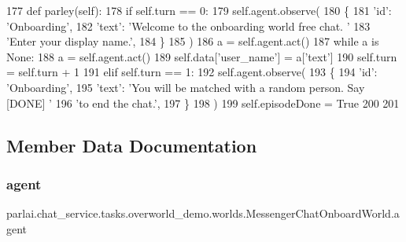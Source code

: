 \begin{DoxyCode}
177     \textcolor{keyword}{def }parley(self):
178         \textcolor{keywordflow}{if} self.turn == 0:
179             self.agent.observe(
180                 \{
181                     \textcolor{stringliteral}{'id'}: \textcolor{stringliteral}{'Onboarding'},
182                     \textcolor{stringliteral}{'text'}: \textcolor{stringliteral}{'Welcome to the onboarding world free chat. '}
183                     \textcolor{stringliteral}{'Enter your display name.'},
184                 \}
185             )
186             a = self.agent.act()
187             \textcolor{keywordflow}{while} a \textcolor{keywordflow}{is} \textcolor{keywordtype}{None}:
188                 a = self.agent.act()
189             self.data[\textcolor{stringliteral}{'user\_name'}] = a[\textcolor{stringliteral}{'text'}]
190             self.turn = self.turn + 1
191         \textcolor{keywordflow}{elif} self.turn == 1:
192             self.agent.observe(
193                 \{
194                     \textcolor{stringliteral}{'id'}: \textcolor{stringliteral}{'Onboarding'},
195                     \textcolor{stringliteral}{'text'}: \textcolor{stringliteral}{'You will be matched with a random person. Say [DONE] '}
196                     \textcolor{stringliteral}{'to end the chat.'},
197                 \}
198             )
199             self.episodeDone = \textcolor{keyword}{True}
200 
201 
\end{DoxyCode}


\subsection{Member Data Documentation}
\mbox{\label{classparlai_1_1chat__service_1_1tasks_1_1overworld__demo_1_1worlds_1_1MessengerChatOnboardWorld_a25d6bf779a4bf7dde0d6e88b0fbf86cb}} 
\subsubsection{\texorpdfstring{agent}{agent}}
{\footnotesize\ttfamily parlai.\+chat\+\_\+service.\+tasks.\+overworld\+\_\+demo.\+worlds.\+Messenger\+Chat\+Onboard\+World.\+agent}



